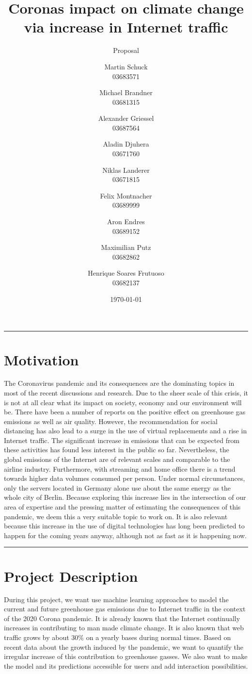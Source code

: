 \documentclass[s=english,inputenc=utf8,fontsize=10pt]{ldvarticle}
\title{Coronas impact on climate change via increase in Internet traffic}
\subtitle{Proposal}
\author{Martin Schuck\\
03683571
\and
Michael Brandner\\
03681315
\and
Alexander Griessel\\
03687564
\and
Aladin Djuhera\\
03671760
\and
Niklas Landerer\\
03671815
\and
Felix Montnacher\\
03689999
\and
Aron Endres\\
03689152
\and
Maximilian Putz\\
03682862
\and
Henrique Soares Frutuoso\\
03682137
}
\date{\today}
\begin{document}
\maketitle
\thispagestyle{empty}

\hrule

\section*{Motivation}

The Coronavirus pandemic and its consequences are the dominating topics in most of the recent discussions and research. Due to the sheer scale of this crisis, it is not at all clear what its impact on society, economy and our environment will be. There have been a number of reports on the positive effect on greenhouse gas emissions as well as air quality. However, the recommendation for social distancing has also lead to a surge in the use of virtual replacements and a rise in Internet traffic. The significant increase in emissions that can be expected from these activities has found less interest in the public so far. Nevertheless, the global emissions of the Internet are of relevant scales and comparable to the airline industry. Furthermore, with streaming and home office there is a trend towards higher data volumes consumed per person. Under normal circumstances, only the servers located in Germany alone use about the same energy as the whole city of Berlin. Because exploring this increase lies in the intersection of our area of expertise and the pressing matter of estimating the consequences of this pandemic, we deem this a very suitable topic to work on. It is also relevant because this increase in the use of digital technologies has long been predicted to happen for the coming years anyway, although not as fast as it is happening now.
\vspace*{1cm}
\hrule

\newpage

\section{Project Description}

During this project, we want use machine learning approaches to model the current and future greenhouse gas emissions due to Internet traffic in the context of the 2020 Corona pandemic. It is already known that the Internet continually increases in contributing to man made climate change. It is also known that web traffic grows by about 30\% on a yearly bases during normal times. Based on recent data about the growth induced by the pandemic, we want to quantify the irregular increase of this contribution to greenhouse gasses. We also want to make the model and its predictions accessible for users and add interaction possibilities.
\end{document}
